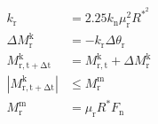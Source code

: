 \documentclass[12pt]{article}
\begin{document}
\begin{align*}
 k_\mathrm{r} & = 2.25 k_\mathrm{n} \mu_\mathrm{r}^2 R^*^2 \\
 \Delta M_\mathrm{r}^\mathrm{k} & = -k_\mathrm{r} \Delta \theta_\mathrm{r} \\
 M_\mathrm{r,t+\Delta t}^\mathrm{k} & = M_\mathrm{r,t}^\mathrm{k} + \Delta M_\mathrm{r}^\mathrm{k} \\
 |M_\mathrm{r,t+\Delta t}^\mathrm{k}| & \leq M_\mathrm{r}^\mathrm{m} \\
 M_\mathrm{r}^\mathrm{m} & = \mu_\mathrm{r} R^* F_\mathrm{n}
\end{align*}
\end{document}
